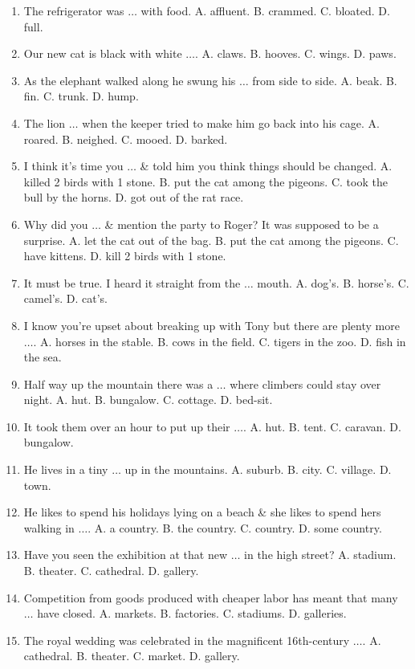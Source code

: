 \documentclass{article}
\numberwithin{equation}{section}
\begin{document}
\begin{enumerate}[leftmargin=2mm]
	\item The refrigerator was $\ldots$ with food. A. affluent. B. crammed. C. bloated. D. full.
	\item Our new cat is black with white $\ldots$. A. claws. B. hooves. C. wings. D. paws.
	\item As the elephant walked along he swung his $\ldots$ from side to side. A. beak. B. fin. C. trunk. D. hump.
	\item The lion $\ldots$ when the keeper tried to make him go back into his cage. A. roared. B. neighed. C. mooed. D. barked.
	\item I think it's time you $\ldots$ \& told him you think things should be changed. A. killed 2 birds with 1 stone. B. put the cat among the pigeons. C. took the bull by the horns. D. got out of the rat race.
	\item Why did you $\ldots$ \& mention the party to Roger? It was supposed to be a surprise. A. let the cat out of the bag. B. put the cat among the pigeons. C. have kittens. D. kill 2 birds with 1 stone.
	\item It must be true. I heard it straight from the $\ldots$ mouth. A. dog's. B. horse's. C. camel's. D. cat's.
	\item I know you're upset about breaking up with Tony but there are plenty more $\ldots$. A. horses in the stable. B. cows in the field. C. tigers in the zoo. D. fish in the sea.
	\item Half way up the mountain there was a $\ldots$ where climbers could stay over night. A. hut. B. bungalow. C. cottage. D. bed-sit.
	\item It took them over an hour to put up their $\ldots$. A. hut. B. tent. C. caravan. D. bungalow.
	\item He lives in a tiny $\ldots$ up in the mountains. A. suburb. B. city. C. village. D. town.
	\item He likes to spend his holidays lying on a beach \& she likes to spend hers walking in $\ldots$. A. a country. B. the country. C. country. D. some country.
	\item Have you seen the exhibition at that new $\ldots$ in the high street? A. stadium. B. theater. C. cathedral. D. gallery.
	\item Competition from goods produced with cheaper labor has meant that many $\ldots$ have closed. A. markets. B. factories. C. stadiums. D. galleries.
	\item The royal wedding was celebrated in the magnificent 16th-century $\ldots$. A. cathedral. B. theater. C. market. D. gallery.

\end{enumerate}
\end{document}
